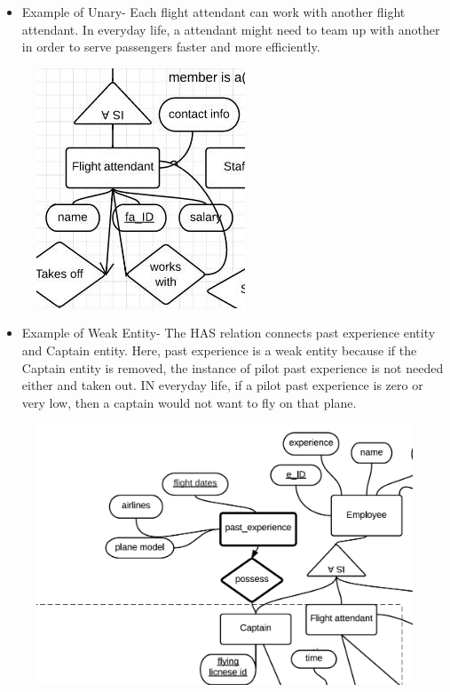 \documentclass[10pt,conference]{IEEEtran}
\begin{document}
\newpage\begin{itemize} \item{
Example of Unary-  Each flight attendant can work with another flight attendant. In everyday life, a attendant might need to team up with another in order to serve passengers faster and more efficiently.} \end{itemize}

\begin{figure}
\centering
\includegraphics[scale=0.5]{unary.jpg}
\end{figure}


\newpage\begin{itemize} \item{
Example of Weak Entity- The HAS relation connects past experience entity and Captain entity. Here, past experience is a weak entity because if the Captain entity is removed, the instance of pilot past experience is not needed either and taken out. IN everyday life, if a pilot past experience is zero or very low, then a captain would not want to fly on that plane.} \end{itemize}


\begin{figure}
\centering
\includegraphics[width=.50\textwidth]{newweak.png}
\end{figure}
\end{document}
